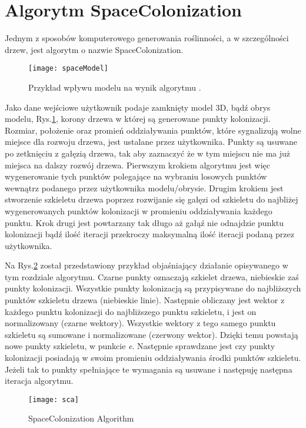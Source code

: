 \documentclass[12pt]{report}
\renewcommand{\figurename}{Rys.}
\begin{document}
\begin{sloppypar}
	
\section{Algorytm SpaceColonization} 
Jednym z sposobów komputerowego generowania roślinności, a w szczególności drzew, jest algorytm o nazwie SpaceColonization\cite{sca}. 
 \begin{figure}[!htb]
\centering
\texttt{[image: spaceModel]} 
\caption{Przykład wpływu modelu na wynik algorytmu \cite{treeSketch}.\label{sca.model}}
\end{figure}
Jako dane wejściowe użytkownik podaje zamknięty model 3D, bądź obrys modelu, \figurename\ref{sca.model}, korony drzewa w której są generowane punkty kolonizacji. Rozmiar, położenie oraz promień oddziaływania punktów, które sygnalizują wolne miejsce dla rozwoju drzewa, jest ustalane przez użytkownika. Punkty są usuwane po zetknięciu z gałęzią drzewa, tak aby zaznaczyć że w tym miejscu nie ma już miejsca na dalszy rozwój drzewa. Pierwszym krokiem algorytmu jest więc wygenerowanie tych punktów polegające na wybraniu losowych punktów wewnątrz podanego przez użytkownika modelu/obrysie. Drugim krokiem jest stworzenie szkieletu drzewa poprzez rozwijanie się gałęzi od szkieletu do najbliżej wygenerowanych punktów kolonizacji w promieniu oddziaływania każdego punktu. Krok drugi jest powtarzany tak długo aż gałąź nie odnajdzie punktu kolonizacji bądź ilość iteracji przekroczy maksymalną ilość iteracji podaną przez użytkownika. 
 \par Na \figurename\ref{sca.obrazek} został przedstawiony przykład objaśniający działanie opisywanego w tym rozdziale algorytmu. Czarne punkty oznaczają szkielet drzewa, niebieskie zaś punkty kolonizacji. Wszystkie punkty kolonizacją są przypisywane do najbliższych punktów szkieletu drzewa (niebieskie linie). Następnie obliczany jest wektor z każdego punktu kolonizacji do najbliższego punktu szkieletu, i jest on normalizowany (czarne wektory). Wszystkie wektory z tego samego punktu szkieletu są sumowane i normalizowane (czerwony wektor). Dzięki temu powstają nowe punkty szkieletu, w punkcie \textit{e}. Następnie sprawdzane jest czy punkty kolonizacji posiadają w swoim promieniu oddziaływania środki punktów szkieletu. Jeżeli tak to punkty spełniające te wymagania są usuwane i następuję następna iteracja algorytmu.
\begin{figure}[!htb]
\centering
\texttt{[image: sca]} 
\caption{SpaceColonization Algorithm\cite{sca} \label{sca.obrazek}}
\end{figure}

\end{sloppypar}
\end{document}
